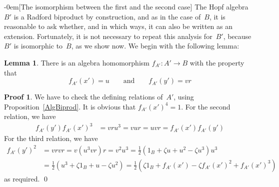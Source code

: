 \documentclass{article}
\makeatletter
\renewcommand{\subsection}{\@startsection{subsection}{2}{0em}%
{\baselineskip}{-0em}{\bfseries\normalsize}}
\numberwithin{equation}{section}
\theoremstyle{definition}
\newtheorem*{lem}{Lemma}
\newtheorem*{pf}{Proof}
\theoremstyle{break}
\newcommand{\ub}{1_B}
\newcommand{\K}{1}
\newcommand{\xu}{x'}
\newcommand{\yu}{y'}
\newcommand{\Au}{A'}
\newcommand{\Bu}{B'}
\newcommand{\1}{{(1)}}
\newcommand{\2}{{(2)}}
\newcommand{\3}{{(3)}}
\makeatother
\begin{document}
\subsection[The isomorphism between the first and the second case]{} \label{Isom}
The Hopf algebra~$\Bu$ is a Radford biproduct by construction, and as in the case of~$B$, it is reasonable to ask whether, and in which ways, it can also be written as an extension. Fortunately, it is not necessary to repeat this analysis for~$\Bu$, because~$\Bu$ is isomorphic to~$B$, as we show now. We begin with the following lemma:
\begin{lem}
There is an algebra homomorphism $f_{A'} \colon \Au \to B$ with the property that
\[f_{A'}(\xu) = u \qquad \text{and} \qquad f_{A'}(\yu) = v r\]
\end{lem}
\begin{pf}
We have to check the defining relations of~$\Au$, using Proposition~\ref{AlgBiprod}. It is obvious that $f_{A'}(\xu)^4 = 1$. For the second relation, we have
\begin{align*}
f_{A'}(\yu) f_{A'}(\xu)^3 &= v r u^3 = v u r = u v r = f_{A'}(\xu) f_{A'}(\yu)
\end{align*}
For the third relation, we have
\begin{align*}
f_{A'}(\yu)^2 &= v r v r = v (u^3 v r) r =  v^2 u^3
= \frac{\K}{2}(\ub + \zeta u + u^2 - \zeta u^3) u^3 \\
&= \frac{\K}{2}(u^3 + \zeta \ub + u - \zeta u^2)
= \frac{\K}{2}(\zeta \ub + f_{A'}(\xu) - \zeta f_{A'}(\xu)^2 + f_{A'}(\xu)^3)
\end{align*}
as required.
\qed
\end{pf}
\end{document}

